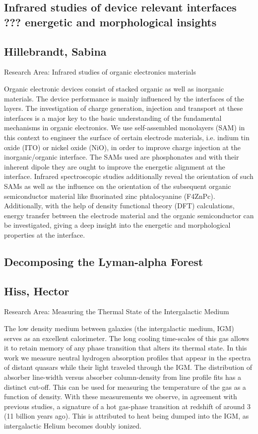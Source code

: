 \subsection*{\centering \large Infrared studies of device relevant interfaces ??? energetic and morphological insights}
\subsection*{\centering \normalsize Hillebrandt, Sabina}
Research Area: Infrared studies of organic electronics materials\newline

\noindent Organic electronic devices consist of stacked organic as well as inorganic materials. The device performance is mainly influenced by the interfaces of the layers. The investigation of charge generation, injection and transport at these interfaces is a major key to the basic understanding of the fundamental mechanisms in organic electronics. We use self-assembled monolayers (SAM) in this context to engineer the surface of certain electrode materials, i.e. indium tin oxide (ITO) or nickel oxide (NiO), in order to improve charge injection at the inorganic/organic interface. The SAMs used are phosphonates and with their inherent dipole they are ought to improve the energetic alignment at the interface. Infrared spectroscopic studies additionally reveal the orientation of such SAMs as well as the influence on the orientation of the subsequent organic semiconductor material like fluorinated zinc phtalocyanine (F4ZnPc). Additionally, with the help of density functional theory (DFT) calculations, energy transfer between the electrode material and the organic semiconductor can be investigated, giving a deep insight into the energetic and morphological properties at the interface.

\newpage
\subsection*{\centering \large Decomposing the Lyman-alpha Forest}
\subsection*{\centering \normalsize Hiss, Hector}
Research Area: Measuring the Thermal State of the Intergalactic Medium\newline

\noindent The low density medium between galaxies (the intergalactic medium, IGM) serves as an excellent calorimeter. The long cooling time-scales of this gas allows it to retain memory of any phase transition that alters its thermal state. In this work we measure neutral hydrogen absorption profiles that appear in the spectra of distant quasars while their light traveled through the IGM. The distribution of absorber line-width versus absorber column-density from line profile fits has a distinct cut-off. This can be used for measuring the temperature of the gas as a function of density. With these measurements we observe, in agreement with previous studies, a signature of a hot gas-phase transition at redshift of around 3 (11 billion years ago). This is attributed to heat being dumped into the IGM, as intergalactic Helium becomes doubly ionized.

